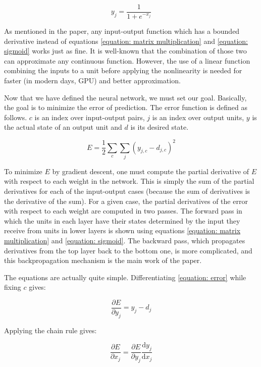 \documentclass{article}
\begin{document}
\begin{equation}
    y_j = \frac{1}{1+e^{-x_j}}
    \label{equation: sigmoid}
\end{equation}

As mentioned in the paper, any input-output function which has a bounded derivative instead of equations \ref{equation: matrix multiplication} and \ref{equation: sigmoid} works just as fine.
It is well-known that the combination of those two can approximate any continuous function.
However, the use of a linear function combining the inputs to a unit before applying the nonlinearity is needed for faster (in modern days, GPU) and better approximation.

Now that we have defined the neural network, we must set our goal. Basically, the goal is to minimize the error of prediction.
The error function is defined as follows.
$c$ is an index over input-output pairs, $j$ is an index over output units, $y$ is the actual state of an output unit and $d$ is its desired state.

\begin{equation}
    E = \frac{1}{2} \sum_{c}^{} \sum_{j}^{} (y_{j,c} - d_{j,c})^{2}
    \label{equation: error}
\end{equation}

To minimize $E$ by gradient descent, one must compute the partial derivative of $E$ with respect to each weight in the network.
This is simply the sum of the partial derivatives for each of the input-output cases (because the sum of derivatives is the derivative of the sum).
For a given case, the partial derivatives of the error with respect to each weight are computed in two passes.
The forward pass in which the units in each layer have their states determined by the input they receive from units in lower layers is shown using equations \ref{equation: matrix multiplication} and \ref{equation: sigmoid}.
The backward pass, which propagates derivatives from the top layer back to the bottom one, is more complicated, and this backpropagation mechanism is the main work of the paper.

The equations are actually quite simple. Differentiating \ref{equation: error} while fixing $c$ gives:

\begin{equation}
    \frac{\partial E}{\partial y_j} = y_j - d_j
    \label{equation: de/dy}
\end{equation}

Applying the chain rule gives:

\begin{equation}
    \frac{\partial E}{\partial x_j} = \frac{\partial E}{\partial y_j} \frac{\mathrm{d}y_j}{\mathrm{d}x_j}
    \label{equation: chain rule}
\end{equation}
\end{document}
